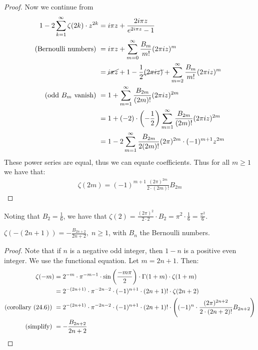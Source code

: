 \begin{proof}
Now we continue from
\begin{align*}
    1 - 2 \sum_{k=1}^\infty \zeta(2k) \cdot z^{2k} &= i \pi z + \frac{2i \pi z}{e^{2 i \pi z} - 1}\\
    \text{(Bernoulli numbers) }&= i \pi z + \sum_{m=0}^\infty \frac{B_m}{m!} (2 \pi i z)^m\\
    &= \cancel{i \pi z} + 1 - \frac{1}{2}\cancel{(2 \pi i z)} + \sum_{m=2}^\infty \frac{B_m}{m!} (2 \pi i z)^m\\
    \text{(odd $B_m$ vanish) } &= 1 + \sum_{m=1}^\infty \frac{B_{2m}}{(2m)!} (2 \pi i z)^{2m}\\
    &= 1 + (-2) \cdot \left( -\frac{1}{2} \right) \sum_{m=1}^\infty \frac{B_{2m}}{(2m)!} (2 \pi i z)^{2m}\\
    &= 1 - 2\sum_{m=1}^\infty \frac{B_{2m}}{2 (2m)!} (2 \pi)^{2m} \cdot (-1)^{m+1} z^{2m}
\end{align*}
These power series are equal, thus we can equate coefficients. Thus for all $m \geq 1$ we have that:
\begin{align*}
    \zeta(2m) = (-1)^{m+1} \frac{(2\pi)^{2m}}{2 \cdot (2m)!} B_{2m}
\end{align*}

\end{proof}

\begin{example} Noting that $B_2 = \frac{1}{6}$, we have that $\zeta(2) = \frac{(2\pi)^2}{2\cdot 2}\cdot B_2 = \pi ^ 2 \cdot \frac{1}{6} = \frac{\pi ^2 }{6}$.
\end{example}

\begin{corollary}
$\zeta(-(2n+1))= - \frac{B_{2n+2}}{2n+2}, \; n \geq 1$, with $B_n$ the Bernoulli numbers.
\end{corollary}

\begin{proof}
Note that if $n$ is a negative odd integer, then $1-n$ is a positive even integer. We use the functional equation. Let $m = 2n+1$. Then:
\begin{align*}
    \zeta(-m) &= 2^{-m} \cdot \pi^{-m-1} \cdot \sin\left( \frac{- m \pi}{2} \right) \cdot \Gamma(1+m) \cdot \zeta(1+m)\\
    &= 2^{-(2n+1)} \cdot \pi^{-2n-2} \cdot (-1)^{n+1} \cdot (2n+1)! \cdot \zeta(2n+2)\\
    \text{(corollary (24.6)) } &= 2^{-(2n+1)} \cdot \pi^{-2n-2} \cdot (-1)^{n+1} \cdot (2n+1)! \cdot \left( (-1)^n \cdot \frac{(2 \pi)^{2n+2}}{2 \cdot (2n+2)!} B_{2n+2}  \right)\\
    \text{(simplify) }&= - \frac{B_{2n+2}}{2n+2}
\end{align*}
\end{proof}

